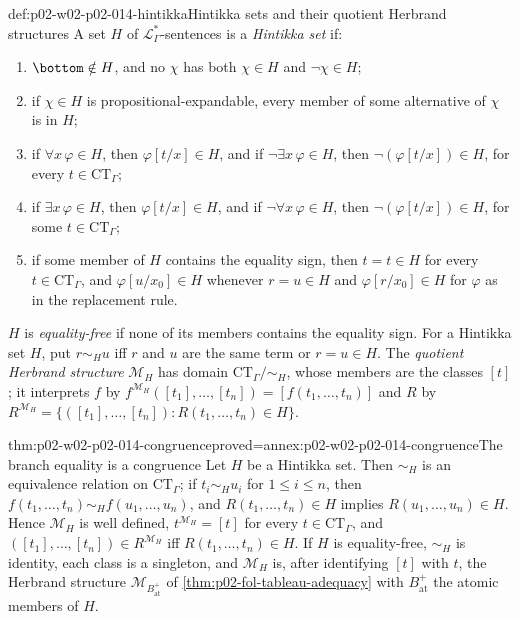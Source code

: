 \begin{hbdefinition}{def:p02-w02-p02-014-hintikka}{Hintikka sets and their quotient Herbrand structures}
A set \(H\) of \(\mathcal L_{\Gamma}^{*}\)-sentences is a \emph{Hintikka
set} if:
\begin{enumerate}
  \item[(H0)] \(\bottom\notin H\), and no \(\chi\) has both \(\chi\in H\)
        and \(\neg\chi\in H\);
  \item[(H1)] if \(\chi\in H\) is propositional-expandable, every member of
        some alternative of \(\chi\) is in \(H\);
  \item[(H2)] if \(\forall x\,\varphi\in H\), then \(\varphi[t/x]\in H\), and
        if \(\neg\exists x\,\varphi\in H\), then \(\neg(\varphi[t/x])\in H\),
        for every \(t\in\mathrm{CT}_{\Gamma}\);
  \item[(H3)] if \(\exists x\,\varphi\in H\), then \(\varphi[t/x]\in H\), and
        if \(\neg\forall x\,\varphi\in H\), then \(\neg(\varphi[t/x])\in H\),
        for some \(t\in\mathrm{CT}_{\Gamma}\);
  \item[(H4)] if some member of \(H\) contains the equality sign, then
        \(t=t\in H\) for every \(t\in\mathrm{CT}_{\Gamma}\), and
        \(\varphi[u/x_0]\in H\) whenever \(r=u\in H\) and
        \(\varphi[r/x_0]\in H\) for \(\varphi\) as in the replacement rule.
\end{enumerate}
\(H\) is \emph{equality-free} if none of its members contains the equality
sign.  For a Hintikka set \(H\), put \(r\sim_H u\) iff \(r\) and \(u\) are
the same term or \(r=u\in H\).  The \emph{quotient Herbrand structure}
\(\mathcal M_H\) has domain \(\mathrm{CT}_{\Gamma}/{\sim_H}\), whose
members are the classes \([t]\); it interprets \(f\) by
\(f^{\mathcal M_H}([t_1],\ldots,[t_n])=[f(t_1,\ldots,t_n)]\) and \(R\) by
\(R^{\mathcal M_H}=\{([t_1],\ldots,[t_n]):R(t_1,\ldots,t_n)\in H\}\).
\end{hbdefinition}

\begin{hblemma}{thm:p02-w02-p02-014-congruence}{proved=annex:p02-w02-p02-014-congruence}{The branch equality is a congruence}
Let \(H\) be a Hintikka set.  Then \(\sim_H\) is an equivalence relation on
\(\mathrm{CT}_{\Gamma}\); if \(t_i\sim_H u_i\) for \(1\leq i\leq n\), then
\(f(t_1,\ldots,t_n)\sim_H f(u_1,\ldots,u_n)\), and
\(R(t_1,\ldots,t_n)\in H\) implies \(R(u_1,\ldots,u_n)\in H\).  Hence
\(\mathcal M_H\) is well defined, \(t^{\mathcal M_H}=[t]\) for every
\(t\in\mathrm{CT}_{\Gamma}\), and
\(([t_1],\ldots,[t_n])\in R^{\mathcal M_H}\) iff
\(R(t_1,\ldots,t_n)\in H\).  If \(H\) is equality-free, \(\sim_H\) is
identity, each class is a singleton, and \(\mathcal M_H\) is, after
identifying \([t]\) with \(t\), the Herbrand structure
\(\mathcal M_{B^{+}_{\mathrm{at}}}\) of
\cref{thm:p02-fol-tableau-adequacy} with \(B^{+}_{\mathrm{at}}\) the atomic
members of \(H\).
\end{hblemma}

